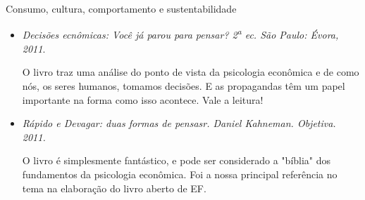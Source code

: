 \begin{paginatexto}{Consumo, cultura, comportamento e sustentabilidade}
\begin{itemize}
    Um livro que é a referência do assunto nos cursos relacionados ao tema no Brasil.
    \item \textit{Decisões ecnômicas: Você já parou para pensar? 2\textsuperscript{a} ec. São Paulo: Évora, 2011}.

    O livro traz uma análise do ponto de vista da psicologia econômica e de como nós, os seres humanos, tomamos decisões. E as propagandas têm um papel importante na forma como isso acontece. Vale a leitura!
    \item \textit{Rápido e Devagar: duas formas de pensasr. Daniel Kahneman. Objetiva. 2011.}

    O livro é simplesmente fantástico, e pode ser considerado a "bíblia"{} dos fundamentos da psicologia econômica. Foi a nossa principal referência no tema na elaboração do livro aberto de EF.
\end{itemize}

\end{paginatexto}

